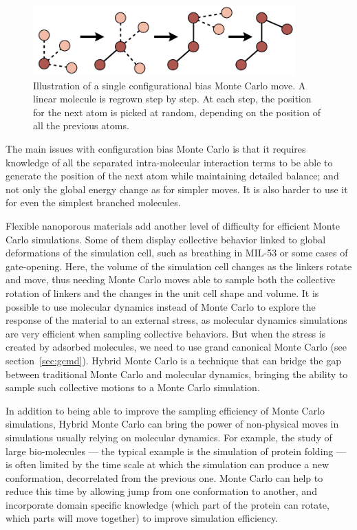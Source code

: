\documentclass[thesis]{subfiles}
\begin{document}
\begin{figure}[ht]
    \centering
    \includegraphics[width=0.9\textwidth]{figures/images/cbmc}
    \caption{Illustration of a single configurational bias Monte Carlo move. A
    linear molecule is regrown step by step. At each step, the position for the
    next atom is picked at random, depending on the position of all the
    previous atoms.}
    \label{fig:cbmc}
\end{figure}

The main issues with configuration bias Monte Carlo is that it requires
knowledge of all the separated intra-molecular interaction terms to be able to
generate the position of the next atom while maintaining detailed balance; and
not only the global energy change as for simpler moves. It is also harder to use
it for even the simplest branched molecules.

Flexible nanoporous materials add another level of difficulty for efficient
Monte Carlo simulations. Some of them display collective behavior linked to
global deformations of the simulation cell, such as breathing in MIL-53 or some
cases of gate-opening. Here, the volume of the simulation cell changes as the
linkers rotate and move, thus needing Monte Carlo moves able to sample both the
collective rotation of linkers and the changes in the unit cell shape and
volume. It is possible to use molecular dynamics instead of Monte Carlo to
explore the response of the material to an external stress, as molecular
dynamics simulations are very efficient when sampling collective behaviors. But
when the stress is created by adsorbed molecules, we need to use grand canonical
Monte Carlo (see section~\ref{sec:gcmd}). Hybrid Monte Carlo is a technique that
can bridge the gap between traditional Monte Carlo and molecular dynamics,
bringing the ability to sample such collective motions to a Monte Carlo
simulation\cite{Rogge2019}.

In addition to being able to improve the sampling efficiency of Monte Carlo
simulations, Hybrid Monte Carlo can bring the power of non-physical moves in
simulations usually relying on molecular dynamics. For example, the study of
large bio-molecules --- the typical example is the simulation of protein folding
--- is often limited by the time scale at which the simulation can produce a new
conformation, decorrelated from the previous one\cite{Izaguirre2004}. Monte
Carlo can help to reduce this time by allowing jump from one conformation to
another, and incorporate domain specific knowledge (which part of the protein
can rotate, which parts will move together) to improve simulation efficiency.
\end{document}
